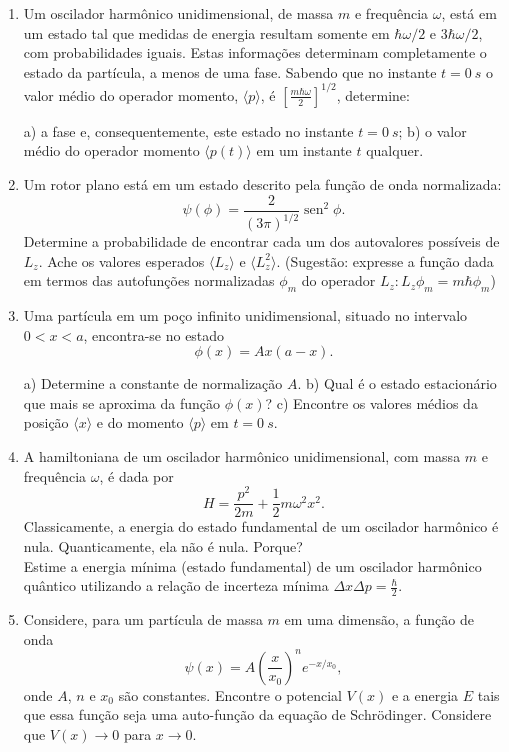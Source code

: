 \begin{enumerate}[start=1,label={\bfseries Q\arabic*.}]
\item Um oscilador harmônico unidimensional, de massa $m$ e frequência $\omega$, está em um estado tal que medidas de energia resultam somente em $\hbar \omega / 2$ e $3 \hbar \omega / 2$, com probabilidades iguais. Estas informações determinam completamente o estado da partícula, a menos de uma fase. Sabendo que no instante $t=0 \ s$ o valor médio do operador momento, $\langle p \rangle$, é $\left[ \frac{m\hbar \omega}{2} \right]^{1/2}$, determine:

  a) a fase e, consequentemente, este estado no instante $t = 0 \ s$;
  b) o valor médio do operador momento $\langle p(t) \rangle$ em um instante $t$ qualquer.




\item Um rotor plano está em um estado descrito pela função de onda normalizada:
$$
\psi (\phi) = \frac{2}{(3\pi)^{1/2}} \operatorname{sen}^{2} \phi.
$$
Determine a probabilidade de encontrar cada um dos autovalores possíveis de $L_{z}$. Ache os valores esperados $\langle L_{z} \rangle$ e $\langle L_{z}^{2} \rangle$. (Sugestão: expresse a função dada em termos das autofunções normalizadas $\phi_{m}$ do operador $L_{z}: L_{z}\phi_{m} = m\hbar \phi_{m}$)



\item Uma partícula em um poço infinito unidimensional, situado no intervalo $0 < x < a$, encontra-se no estado
$$
\phi(x) = Ax(a-x).
$$

  a) Determine a constante de normalização $A$.
  b) Qual é o estado estacionário que mais se aproxima da função $\phi(x)$?
  c) Encontre os valores médios da posição $\langle x \rangle$ e do momento $\langle p \rangle$ em $t=0 \ s$.




\item A hamiltoniana de um oscilador harmônico unidimensional, com massa $m$ e frequência $\omega$, é dada por
$$
H = \frac{p^{2}}{2m} + \frac{1}{2} m \omega^{2} x^{2}.
$$
Classicamente, a energia do estado fundamental de um oscilador harmônico é nula. Quanticamente, ela não é nula. Porque? \\
Estime a energia mínima (estado fundamental) de um oscilador harmônico quântico utilizando a relação de incerteza mínima $\Delta x \Delta p = \frac{\hbar}{2}$.





\item Considere, para um partícula de massa $m$ em uma dimensão, a função de onda
$$
\psi(x) = A \left( \frac{x}{x_{0}} \right)^{n} e^{-x/x_{0}},
$$
onde $A$, $n$ e $x_{0}$ são constantes. Encontre o potencial $V(x)$ e a energia $E$ tais que essa função seja uma auto-função da equação de Schrödinger. Considere que $V(x) \rightarrow 0$ para $x \rightarrow 0$.



\end{enumerate}
